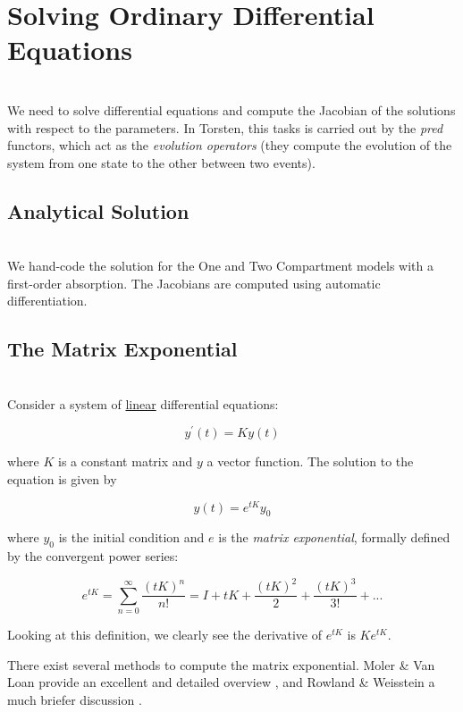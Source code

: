 \documentclass[11pt]{amsart}
\begin{document}
\clearpage

\section{Solving Ordinary Differential Equations} \ \\

We need to solve differential equations and compute the Jacobian of the solutions with
respect to the parameters. In Torsten, this tasks is carried out by the \textit{pred} functors,
which act as the \textit{evolution operators} (they compute the evolution of the system from
one state to the other between two events). 

\subsection{Analytical Solution} \ \\

We hand-code the solution for the One and Two Compartment models with a first-order
absorption. The Jacobians are computed using automatic differentiation.

\subsection{The Matrix Exponential} \ \\

Consider a system of \underline{linear} differential equations:

$$ y^\prime(t) = Ky(t) $$

where $K$ is a constant matrix and $y$ a vector function. The solution to the equation is given by 

$$ y(t) = e^{tK} y_0$$

where $y_0$ is the initial condition and $e$ is the \textit{matrix exponential}, formally defined
by the convergent power series:

$$ e^{tK} = \sum_{n=0}^{\infty} \dfrac{(tK)^n}{n!} = I + tK + \frac{(tK)^2}{2} + \frac{(tK)^3}{3!} + ...$$

Looking at this definition, we clearly see the derivative of $e^{tK}$ is $Ke^{tK}$.

There exist several methods to compute the matrix exponential. Moler \& Van Loan provide
an excellent and detailed overview \cite{MolerAndVanLoan:2003}, and Rowland \& Weisstein 
a much briefer discussion \cite{ToddWeisstein}.
\end{document}
